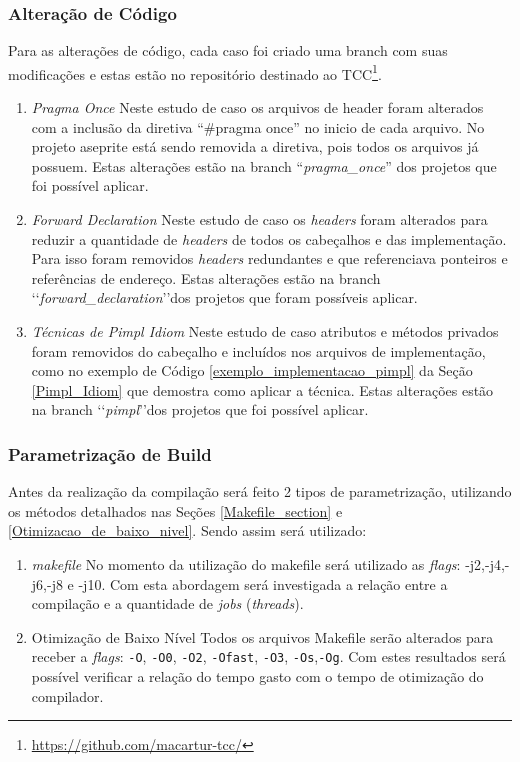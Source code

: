 \subsubsection{Alteração de Código}

 Para as alterações de código, cada caso foi criado
 uma branch com suas modificações e estas estão no repositório
 destinado ao TCC\footnote{\url{https://github.com/macartur-tcc/}}.

    \begin{enumerate}
        \item \textit{Pragma Once}
        \subitem Neste estudo de caso os arquivos de header foram alterados
 com a inclusão da diretiva “\#pragma once” no inicio de cada arquivo.
 No projeto aseprite está sendo removida a diretiva, pois todos os arquivos já possuem.
Estas alterações estão na branch “\textit{pragma\_once}” dos projetos que foi possível aplicar.
        \item \textit{Forward Declaration}
        \subitem Neste estudo de caso os \textit{headers} foram alterados para reduzir
 a quantidade de \textit{headers} de todos os cabeçalhos e das implementação.
 Para isso foram removidos \textit{headers} redundantes e que referenciava
 ponteiros e referências de endereço.
Estas alterações estão na branch \lq\lq\textit{forward\_declaration}\rq\rq dos projetos que foram possíveis  aplicar.
        \item \textit{Técnicas de Pimpl Idiom}
        \subitem Neste estudo de caso atributos e métodos privados foram removidos do cabeçalho
 e incluídos nos arquivos de implementação, como no exemplo de Código \ref{exemplo_implementacao_pimpl} da Seção \ref{Pimpl_Idiom}
 que demostra como aplicar a técnica.
Estas alterações estão na branch \lq\lq\textit{pimpl}\rq\rq dos projetos que foi possível aplicar.
    \end{enumerate}

\subsubsection{Parametrização de Build}

	Antes da realização da compilação será feito 2 tipos de parametrização,
 utilizando os métodos detalhados nas Seções \ref{Makefile_section} e 
\ref{Otimizacao_de_baixo_nivel}. Sendo assim será utilizado: 

        \begin{enumerate}
            \item \textit{makefile}
                \subitem No momento da utilização do makefile será utilizado
 as \textit{flags}: -j2,-j4,-j6,-j8 e -j10.
 Com esta abordagem será investigada a relação entre a compilação
 e a quantidade de \textit{jobs} (\textit{threads}).
            \item Otimização de Baixo Nível
                \subitem Todos os arquivos Makefile serão
 alterados para receber a \textit{flags}: \texttt{-O}, \texttt{-O0}, \texttt{-O2}, \texttt{-Ofast}, \texttt{-O3}, \texttt{-Os},\texttt{-Og}.
 Com estes resultados será possível verificar a relação do tempo gasto com
 o tempo de otimização do compilador.
        \end{enumerate}

